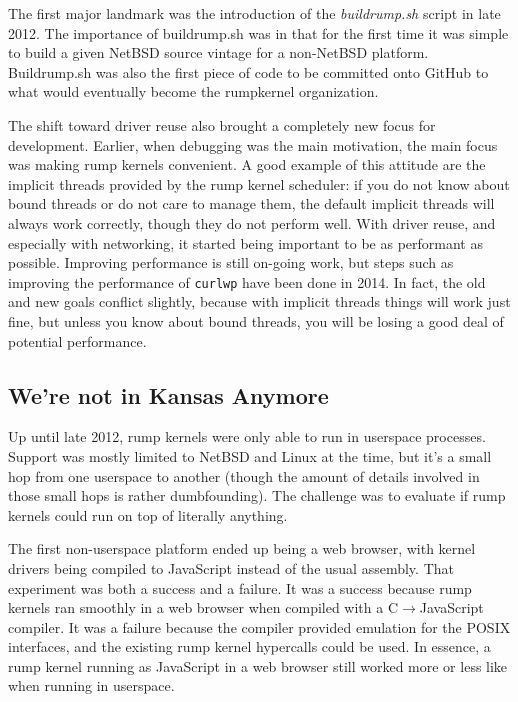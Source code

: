 The first major landmark was the introduction of the \textit{buildrump.sh}
script in late 2012.  The importance of buildrump.sh was in that for the first
time it was simple to build a given NetBSD source vintage for a non-NetBSD
platform.  Buildrump.sh was also the first piece of code to be committed
onto GitHub to what would eventually become the rumpkernel organization.

The shift toward driver reuse also brought a completely new focus
for development.  Earlier, when debugging was the main motivation,
the main focus was making rump kernels convenient.  A good example of
this attitude are the implicit threads provided by the rump kernel
scheduler: if you do not know about bound threads or do not care to
manage them, the default implicit threads will always work correctly,
though they do not perform well.  With driver reuse, and especially with
networking, it started being important to be as performant as possible.
Improving performance is still on-going work, but steps such as improving
the performance of \texttt{curlwp} have been done in 2014.  In fact,
the old and new goals conflict slightly, because with implicit threads
things will work just fine, but unless you know about bound threads,
you will be losing a good deal of potential performance.


\subsection{We're not in Kansas Anymore}

Up until late 2012, rump kernels were only able to run in userspace
processes.  Support was mostly limited to NetBSD and Linux at the time,
but it's a small hop from one userspace to another (though the amount
of details involved in those small hops is rather dumbfounding).
The challenge was to evaluate if rump kernels could run on top of
literally anything.

The first non-userspace platform ended up being a web browser, with
kernel drivers being compiled to JavaScript instead of the usual assembly.
That experiment was both a success and a failure.  It was a success
because rump kernels ran smoothly in a web browser when compiled with a
C$\rightarrow$JavaScript compiler.  It was a failure because the compiler
provided emulation for the POSIX interfaces, and the existing rump kernel
hypercalls could be used.  In essence, a rump kernel running as JavaScript
in a web browser still worked more or less like when running in userspace.

